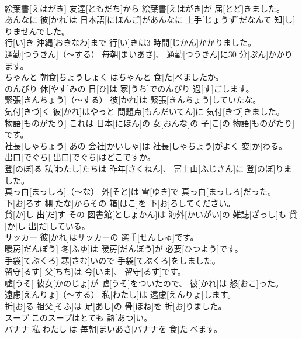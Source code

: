 \documentclass[8pt]{extreport}
\begin{document}
\begin{CJK}{UTF8}{min}
\\	絵葉書[えはがき]	友達[ともだち]から 絵葉書[えはがき]が 届[とど]きました。		
\\	あんなに	彼[かれ]は 日本語[にほんご]があんなに 上手[じょうず]だなんて 知[し]りませんでした。		
\\	行[い]き	沖縄[おきなわ]まで 行[い]きは3 時間[じかん]かかりました。		
\\	通勤[つうきん]（～する）	毎朝[まいあさ]、 通勤[つうきん]に30 分[ぷん]かかります。		
\\	ちゃんと	朝食[ちょうしょく]はちゃんと 食[た]べましたか。		
\\	のんびり	休[やす]みの 日[ひ]は 家[うち]でのんびり 過[す]ごします。		
\\	緊張[きんちょう]（～する）	彼[かれ]は 緊張[きんちょう]していたな。		
\\	気付[きづ]く	彼[かれ]はやっと 問題点[もんだいてん]に 気付[きづ]きました。		
\\	物語[ものがたり]	これは 日本[にほん]の 女[おんな]の 子[こ]の 物語[ものがたり]です。		
\\	社長[しゃちょう]	あの 会社[かいしゃ]は 社長[しゃちょう]がよく 変[か]わる。		
\\	出口[でぐち]	出口[でぐち]はどこですか。		
\\	登[のぼ]る	私[わたし]たちは 昨年[さくねん]、 富士山[ふじさん]に 登[のぼ]りました。		
\\	真っ白[まっしろ]（～な）	外[そと]は 雪[ゆき]で 真っ白[まっしろ]だった。		
\\	下[お]ろす	棚[たな]からその 箱[はこ]を 下[お]ろしてください。		
\\	貸[か]し 出[だ]す	その 図書館[としょかん]は 海外[かいがい]の 雑誌[ざっし]も 貸[か]し 出[だ]している。		
\\	サッカー	彼[かれ]はサッカーの 選手[せんしゅ]です。		
\\	暖房[だんぼう]	冬[ふゆ]は 暖房[だんぼう]が 必要[ひつよう]です。		
\\	手袋[てぶくろ]	寒[さむ]いので 手袋[てぶくろ]をしました。		
\\	留守[るす]	父[ちち]は 今[いま]、 留守[るす]です。		
\\	嘘[うそ]	彼女[かのじょ]が 嘘[うそ]をついたので、 彼[かれ]は 怒[おこ]った。		
\\	遠慮[えんりょ]（～する）	私[わたし]は 遠慮[えんりょ]します。		
\\	折[お]る	祖父[そふ]は 足[あし]の 骨[ほね]を 折[お]りました。		
\\	スープ	このスープはとても 熱[あつ]い。		
\\	バナナ	私[わたし]は 毎朝[まいあさ]バナナを 食[た]べます。		

\end{CJK}
\end{document}
